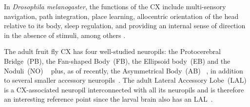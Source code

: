         In \textit{Drosophila melanogaster}, the functions of the CX include multi-sensory navigation, path integration, place learning, allocentric orientation of the head relative to its body, sleep regulation, and providing an internal sense of direction in the absence of stimuli, among others \citep{hanesch1989neuronal, ofstad2011visual, seelig2013feature, PfeifferHomberg2014, Stone2017CXModel, franconville2018building, heinze2018principles, szuperak2018sleep, pisokas2020head, ShaferKeene2021sleep, fisher2022flexible}.

        The adult fruit fly CX has four well-studied neuropils: the Protocerebral Bridge~(PB), the Fan-shaped Body~(FB), the Ellipsoid body~(EB) and the Noduli~(NO) ~\citep{hanesch1989neuronal} plus, as of recently, the Asymmetrical Body~(AB) ~\citep{wolff2018neuroarchitecture}, in addition to several smaller accessory neuropils~\citep{wolff2015neuroarchitecture, franconville2018building, hulse2021connectome}. The adult Lateral Accessory Lobe~(LAL) is a CX-associated neuropil interconnected with all its neuropils \citep{hulse2021connectome} and is therefore an interesting reference point since the larval brain also has an LAL~\citep{pereanu2010neuropildev}.





